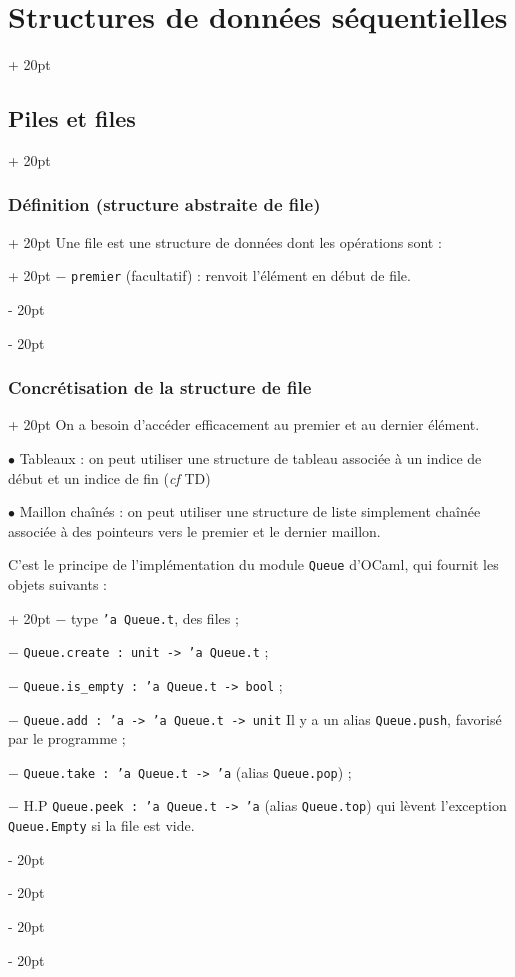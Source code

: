 \documentclass[a4paper, 12pt, twoside]{article}
\newcommand{\ind}[1][20pt]{\advance\leftskip + #1}
\newcommand{\deind}[1][20pt]{\advance\leftskip - #1}
\newenvironment{indt}[2][20pt]{#2 \par \ind[#1]}{\par \deind} %
\begin{document}
\begin{indt}{\section{Structures de données séquentielles}}
\begin{indt}{\subsection{Piles et files}}
\begin{indt}{\subsubsection{Définition (structure abstraite de file)}}
\begin{indt}{Une file est une structure de données dont les opérations sont :}
                    $-$ \texttt{premier} (facultatif) : renvoit l'élément en début de file.
                \end{indt}
            \end{indt}
            
            \vspace{6pt}
            
            \begin{indt}{\subsubsection{Concrétisation de la structure de file}}
                On a besoin d'accéder efficacement au premier et au dernier élément.
                
                \vspace{6pt}
                
                $\bullet$ Tableaux : on peut utiliser une structure de tableau associée à un indice de début et un indice de fin (\textit{cf} TD)
                
                \vspace{6pt}
                
                $\bullet$ Maillon chaînés : on peut utiliser une structure de liste simplement chaînée associée à des pointeurs vers le premier et le dernier maillon.
                
                \begin{indt}{C'est le principe de l'implémentation du module \texttt{Queue} d'OCaml, qui fournit les objets suivants :}
                    $-$ type \texttt{'a Queue.t}, des files ;
                    
                    $-$ \texttt{Queue.create : unit -> 'a Queue.t} ;
                    
                    $-$ \texttt{Queue.is\_empty : 'a Queue.t -> bool} ;
                    
                    $-$ \texttt{Queue.add : 'a -> 'a Queue.t -> unit} Il y a un alias \texttt{Queue.push}, favorisé par le programme ;
                    
                    $-$ \texttt{Queue.take : 'a Queue.t -> 'a} (alias \texttt{Queue.pop}) ;
                    
                    $-$ H.P \texttt{Queue.peek : 'a Queue.t -> 'a} (alias \texttt{Queue.top}) qui lèvent l'exception \texttt{Queue.Empty} si la file est vide.
                \end{indt}
                

\end{indt}
\end{indt}
\end{indt}
\end{document}
